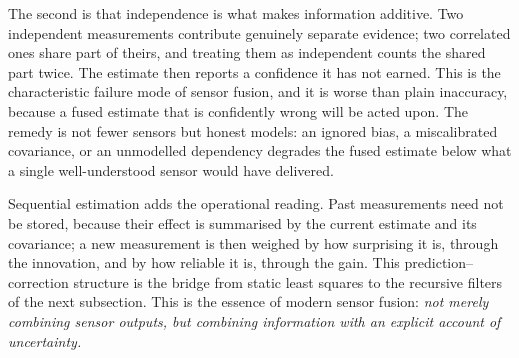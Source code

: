 \documentclass[11pt,oneside,openany]{book}
\begin{document}
The second is that independence is what makes information additive. Two independent measurements contribute genuinely separate evidence; two correlated ones share part of theirs, and treating them as independent counts the shared part twice. The estimate then reports a confidence it has not earned. This is the characteristic failure mode of sensor fusion, and it is worse than plain inaccuracy, because a fused estimate that is confidently wrong will be acted upon. The remedy is not fewer sensors but honest models: an ignored bias, a miscalibrated covariance, or an unmodelled dependency degrades the fused estimate below what a single well-understood sensor would have delivered.

Sequential estimation adds the operational reading. Past measurements need not be stored, because their effect is summarised by the current estimate and its covariance; a new measurement is then weighed by how surprising it is, through the innovation, and by how reliable it is, through the gain. This prediction--correction structure is the bridge from static least squares to the recursive filters of the next subsection.
This is the essence of modern sensor fusion: \emph{not merely combining sensor outputs, but combining information with an explicit account of uncertainty.}
\end{document}
